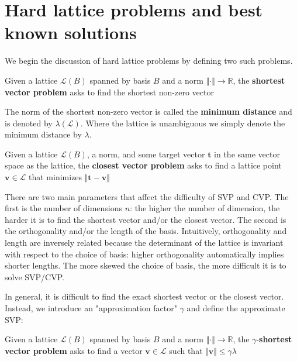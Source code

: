 \section{Hard lattice problems and best known solutions}
We begin the discussion of hard lattice problems by defining two such problems.

\begin{definition}
    Given a lattice $\mathcal{L}(B)$ spanned by basis $B$ and a norm $\Vert \cdot \Vert \rightarrow \mathbb{R}$, the \textbf{shortest vector problem} asks to find the shortest non-zero vector
\end{definition}

The norm of the shortest non-zero vector is called the \textbf{minimum distance} and is denoted by $\lambda(\mathcal{L})$. Where the lattice is unambiguous we simply denote the minimum distance by $\lambda$.

\begin{definition}
    Given a lattice $\mathcal{L}(B)$, a norm, and some target vector $\mathbf{t}$ in the same vector space as the lattice, the \textbf{closest vector problem} asks to find a lattice point $\mathbf{v} \in \mathcal{L}$ that minimizes $\Vert \mathbf{t} - \mathbf{v}\Vert$
\end{definition}

There are two main parameters that affect the difficulty of SVP and CVP. The first is the number of dimensions $n$: the higher the number of dimension, the harder it is to find the shortest vector and/or the closest vector. The second is the orthogonality and/or the length of the basis. Intuitively, orthogonality and length are inversely related because the determinant of the lattice is invariant with respect to the choice of basis: higher orthogonality automatically implies shorter lengths. The more skewed the choice of basis, the more difficult it is to solve SVP/CVP.

In general, it is difficult to find the exact shortest vector or the closest vector. Instead, we introduce an "approximation factor" $\gamma$ and define the approximate SVP:

\begin{definition}
    Given a lattice $\mathcal{L}(B)$ spanned by basis $B$ and a norm $\Vert \cdot \Vert \rightarrow \mathbb{R}$, the $\gamma$-\textbf{shortest vector problem} asks to find a vector $\mathbf{v} \in \mathcal{L}$ such that $\Vert \mathbf{v} \Vert \leq \gamma \lambda$
\end{definition}

